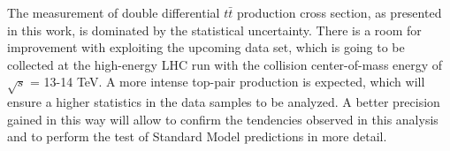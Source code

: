 The measurement of double differential $t\bar{t}$ production cross section, as presented in this work, is dominated by the statistical
uncertainty. There is a room for improvement with exploiting the upcoming data set, which is going to be collected at the high-energy LHC
run with the collision center-of-mass energy of $\sqrt{s}$ = 13-14 TeV. A more intense top-pair production is expected, which will ensure
a higher statistics in the data samples to be analyzed. A better precision gained in this way will allow to confirm the tendencies 
observed in this analysis and to perform the test of Standard Model predictions in more detail.